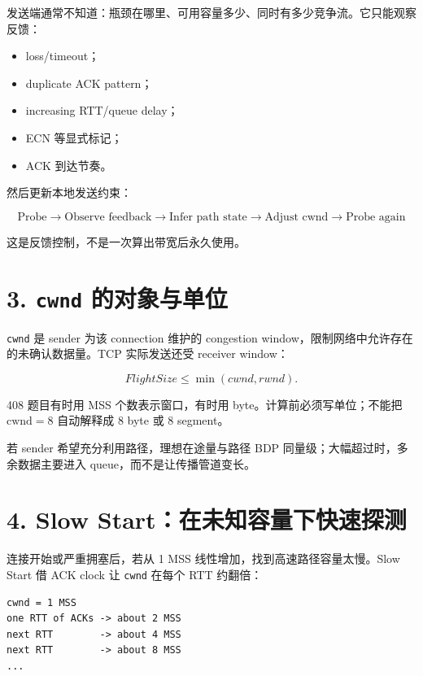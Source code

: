 \documentclass[UTF8,fontset=none,11pt,a4paper]{ctexart}
\providecommand{\tightlist}{\setlength{\itemsep}{0pt}\setlength{\parskip}{0pt}}
\providecommand{\passthrough}[1]{#1}
\begin{document}
发送端通常不知道：瓶颈在哪里、可用容量多少、同时有多少竞争流。它只能观察反馈：

\begin{itemize}
\tightlist
\item
  loss/timeout；
\item
  duplicate ACK pattern；
\item
  increasing RTT/queue delay；
\item
  ECN 等显式标记；
\item
  ACK 到达节奏。
\end{itemize}

然后更新本地发送约束：

\[
\boxed{
\text{Probe}
\to \text{Observe feedback}
\to \text{Infer path state}
\to \text{Adjust cwnd}
\to \text{Probe again}
}
\]

这是反馈控制，不是一次算出带宽后永久使用。

\section{\texorpdfstring{3. \texttt{cwnd}
的对象与单位}{3. cwnd 的对象与单位}}\label{3-cwnd-ux7684ux5bf9ux8c61ux4e0eux5355ux4f4d}

\passthrough{\lstinline!cwnd!} 是 sender 为该 connection 维护的
congestion window，限制网络中允许存在的未确认数据量。TCP 实际发送还受
receiver window：

\[
FlightSize\le \min(cwnd,rwnd).
\]

408 题目有时用 MSS 个数表示窗口，有时用 byte。计算前必须写单位；不能把
\(\text{cwnd} = 8\) 自动解释成 8 byte 或 8 segment。

若 sender 希望充分利用路径，理想在途量与路径 BDP
同量级；大幅超过时，多余数据主要进入 queue，而不是让传播管道变长。

\section{4. Slow
Start：在未知容量下快速探测}\label{4-slow-startux5728ux672aux77e5ux5bb9ux91cfux4e0bux5febux901fux63a2ux6d4b}

连接开始或严重拥塞后，若从 1 MSS 线性增加，找到高速路径容量太慢。Slow
Start 借 ACK clock 让 \passthrough{\lstinline!cwnd!} 在每个 RTT 约翻倍：

\begin{lstlisting}
cwnd = 1 MSS
one RTT of ACKs -> about 2 MSS
next RTT        -> about 4 MSS
next RTT        -> about 8 MSS
...
\end{lstlisting}
\end{document}
